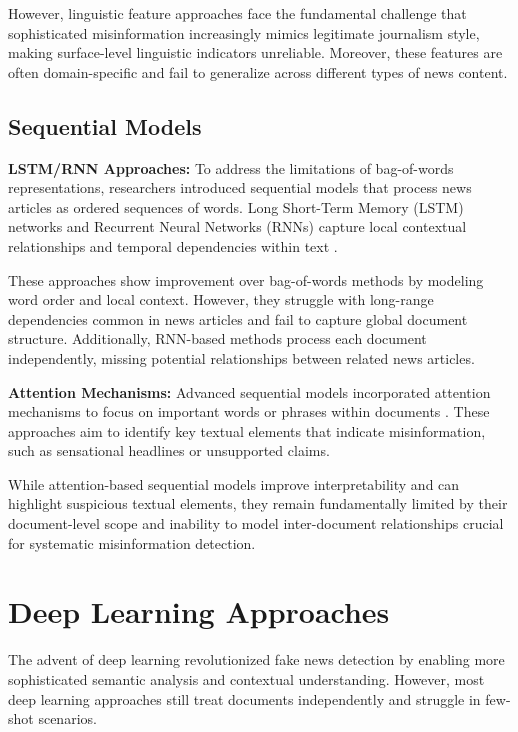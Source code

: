 However, linguistic feature approaches face the fundamental challenge that sophisticated misinformation increasingly mimics legitimate journalism style, making surface-level linguistic indicators unreliable. Moreover, these features are often domain-specific and fail to generalize across different types of news content.

\subsection{Sequential Models}

\textbf{LSTM/RNN Approaches:} To address the limitations of bag-of-words representations, researchers introduced sequential models that process news articles as ordered sequences of words. Long Short-Term Memory (LSTM) networks and Recurrent Neural Networks (RNNs) capture local contextual relationships and temporal dependencies within text \cite{ma2016detecting, yu2017convolutional}.

These approaches show improvement over bag-of-words methods by modeling word order and local context. However, they struggle with long-range dependencies common in news articles and fail to capture global document structure. Additionally, RNN-based methods process each document independently, missing potential relationships between related news articles.

\textbf{Attention Mechanisms:} Advanced sequential models incorporated attention mechanisms to focus on important words or phrases within documents \cite{wang2018eann, liu2018early}. These approaches aim to identify key textual elements that indicate misinformation, such as sensational headlines or unsupported claims.

While attention-based sequential models improve interpretability and can highlight suspicious textual elements, they remain fundamentally limited by their document-level scope and inability to model inter-document relationships crucial for systematic misinformation detection.

\section{Deep Learning Approaches}

The advent of deep learning revolutionized fake news detection by enabling more sophisticated semantic analysis and contextual understanding. However, most deep learning approaches still treat documents independently and struggle in few-shot scenarios.

